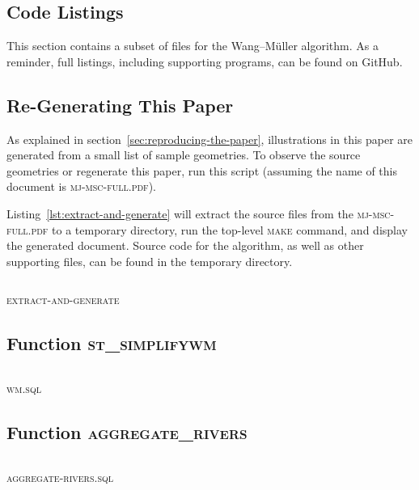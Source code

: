 \documentclass[a4paper]{article}
\newcommand{\WM}{Wang--M{\"u}ller}
\newcommand{\inputcode}[2]{\inputminted[fontsize=\small]{#1}{#2}}
\newenvironment{longlisting}{\captionsetup{type=listing}}{}
\begin{document}
\begin{appendices}

\section{Code Listings}

This section contains a subset of files for the {\WM} algorithm. As a reminder,
    full listings, including supporting programs, can be found on
    GitHub\cite{wmsql}.

\subsection{Re-Generating This Paper}
\label{sec:code-regenerate}

As explained in section~\ref{sec:reproducing-the-paper}, illustrations in
    this paper are generated from a small list of sample geometries. To observe
    the source geometries or regenerate this paper, run this script (assuming
    the name of this document is \textsc{mj-msc-full.pdf}).

    Listing~\ref{lst:extract-and-generate} will extract the source files from
    the \textsc{mj-msc-full.pdf} to a temporary directory, run the top-level
    \textsc{make} command, and display the generated document. Source code for
    the algorithm, as well as other supporting files, can be found in the
    temporary directory.

\begin{longlisting}
    \inputcode{bash}{extract-and-generate}
    \caption{\textsc{extract-and-generate}}
    \label{lst:extract-and-generate}
\end{longlisting}

\subsection{Function \textsc{st\_simplifywm}}
\begin{longlisting}
    \inputcode{postgresql}{wm.sql}
    \caption{\textsc{wm.sql}}
    \label{lst:wm.sql}
\end{longlisting}

\subsection{Function \textsc{aggregate\_rivers}}
\begin{longlisting}
    \inputcode{postgresql}{aggregate-rivers.sql}
    \caption{\textsc{aggregate-rivers.sql}}
    \label{lst:aggregate-rivers.sql}
\end{longlisting}

\end{appendices}
\end{document}
